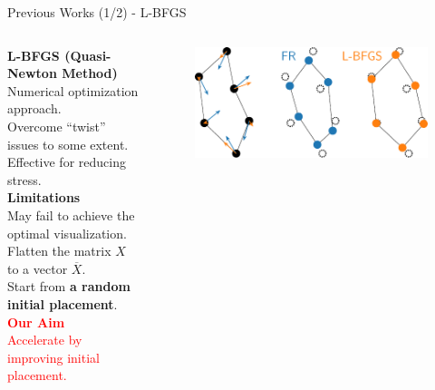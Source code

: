 \documentclass[dvipdfmx,13pt,aspectratio=169]{beamer}
\newcommand{\red}[1]{\textcolor{red}{#1}}
\newif\ifShowHidden
\begin{document}
\ifShowHidden
  \begin{frame}{``Twist'' Causes Stagnation}
    \large{%
      \textbf{Twist}: unnecessary folded and tangled structures~\cite{veldhuizenDynamicMultilevelGraph2007,cheongSnapshotVisualizationComplex2018}.\\
      $\to$ Causing stagnation of the simulation process.\\
      Slow for large-scale graphs. $\order{\abs{V}^2}$ per iteration.
    }
    \begin{figure}[htbp]
      \centering
      \animategraphics[autoplay,loop,width=0.4\columnwidth]{5}{circle/circle-}{1}{50}%
    \end{figure}
  \end{frame}
\fi

\ifShowHidden
  \begin{frame}{Previous Works (1/2) - L-BFGS}
    \begin{columns}
      \begin{column}{0.6\columnwidth}
        \large{\textbf{L-BFGS (Quasi-Newton Method)}}~\cite{6183577}\\
        \quad Numerical optimization approach.\\
        \quad Overcome ``twist'' issues to some extent.\\
        \quad Effective for reducing stress.\\[1.5em]
        \textbf{Limitations}\\
        \quad May fail to achieve the optimal visualization.\\
        \quad Flatten the matrix $X$ to a vector $\overline{X}$.\\
        \quad Start from \textbf{a random initial placement}.\\[1.5em]
        \textbf{\red{Our Aim}}\\
        \quad \red{Accelerate by improving initial placement.}\\
      \end{column}
      \begin{column}{0.4\columnwidth}
        \begin{figure}[htbp]
          \centering
          \includegraphics[width=\columnwidth]{../main/comparison/comparison_FRandLBFGS.pdf}

\end{figure}
\end{column}
\end{columns}
\end{frame}
\end{document}
